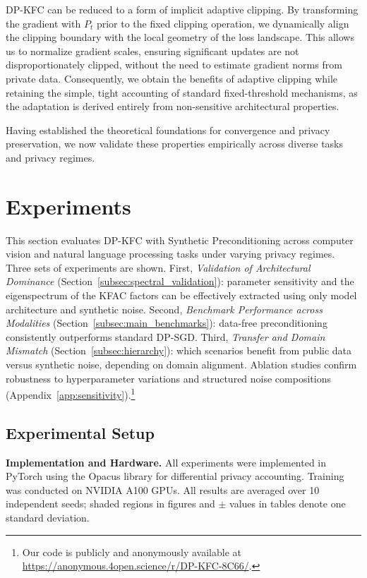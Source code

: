 \documentclass{article}
\theoremstyle{plain}
\theoremstyle{definition}
\theoremstyle{remark}
\begin{document}
DP-KFC can be reduced to a form of implicit adaptive clipping. By transforming the gradient with $P_t$ prior to the fixed clipping operation, we dynamically align the clipping boundary with the local geometry of the loss landscape. This allows us to normalize gradient scales, ensuring significant updates are not disproportionately clipped, without the need to estimate gradient norms from private data. Consequently, we obtain the benefits of adaptive clipping \cite{andrew2021differentially} while retaining the simple, tight accounting of standard fixed-threshold mechanisms, as the adaptation is derived entirely from non-sensitive architectural properties.

Having established the theoretical foundations for convergence and privacy preservation, we now validate these properties empirically across diverse tasks and privacy regimes.

\section{Experiments}
\label{sec:experiments}

This section evaluates DP-KFC with Synthetic Preconditioning across computer vision and natural language processing tasks under varying privacy regimes. Three sets of experiments are shown. First, \emph{Validation of Architectural Dominance} (Section~\ref{subsec:spectral_validation}): parameter sensitivity and the eigenspectrum of the KFAC factors can be effectively extracted using only model architecture and synthetic noise. Second, \emph{Benchmark Performance across Modalities} (Section~\ref{subsec:main_benchmarks}): data-free preconditioning consistently outperforms standard DP-SGD. Third, \emph{Transfer and Domain Mismatch} (Section~\ref{subsec:hierarchy}): which scenarios benefit from public data versus synthetic noise, depending on domain alignment.  Ablation studies confirm robustness to hyperparameter variations and structured noise compositions (Appendix~\ref{app:sensitivity}).\footnote{Our code is publicly and anonymously available at \url{https://anonymous.4open.science/r/DP-KFC-8C66/}.}

\subsection{Experimental Setup}
\label{subsec:setup}

\textbf{Implementation and Hardware.} All experiments were implemented in PyTorch using the Opacus library \cite{opacus} for differential privacy accounting. Training was conducted on NVIDIA A100 GPUs. All results are averaged over 10 independent seeds; shaded regions in figures and $\pm$ values in tables denote one standard deviation.
\end{document}
